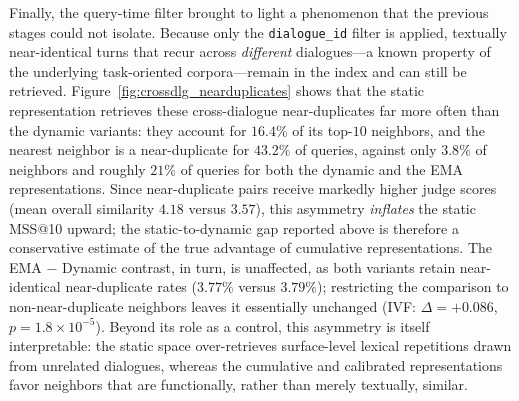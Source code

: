 \documentclass[runningheads]{llncs}
\begin{document}

Finally, the query-time filter brought to light a phenomenon that the previous stages could not isolate. Because only the \texttt{dialogue\_id} filter is applied, textually near-identical turns that recur across \emph{different} dialogues---a known property of the underlying task-oriented corpora---remain in the index and can still be retrieved. Figure~\ref{fig:crossdlg_nearduplicates} shows that the static representation retrieves these cross-dialogue near-duplicates far more often than the dynamic variants: they account for $16.4\%$ of its top-$10$ neighbors, and the nearest neighbor is a near-duplicate for $43.2\%$ of queries, against only $3.8\%$ of neighbors and roughly $21\%$ of queries for both the dynamic and the EMA representations. Since near-duplicate pairs receive markedly higher judge scores (mean overall similarity $4.18$ versus $3.57$), this asymmetry \emph{inflates} the static MSS@10 upward; the static-to-dynamic gap reported above is therefore a conservative estimate of the true advantage of cumulative representations. The EMA $-$ Dynamic contrast, in turn, is unaffected, as both variants retain near-identical near-duplicate rates ($3.77\%$ versus $3.79\%$); restricting the comparison to non-near-duplicate neighbors leaves it essentially unchanged (IVF: $\Delta=+0.086$, $p=1.8\times10^{-5}$). Beyond its role as a control, this asymmetry is itself interpretable: the static space over-retrieves surface-level lexical repetitions drawn from unrelated dialogues, whereas the cumulative and calibrated representations favor neighbors that are functionally, rather than merely textually, similar.
\end{document}
